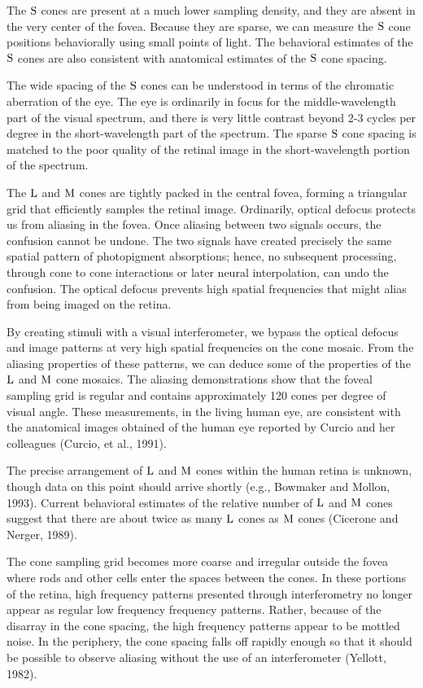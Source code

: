 The $\mbox{S}$ cones are present at a much lower
sampling density, and they are absent in the very
center of the fovea.
Because they are sparse,
we can measure the $\mbox{S}$ cone positions
behaviorally using small points of light.
The behavioral estimates of the $\mbox{S}$ cones
are also consistent with anatomical
estimates of the $\mbox{S}$ cone spacing.

The wide spacing of the $\mbox{S}$ cones can be understood
in terms of the chromatic aberration of the eye.
The eye is ordinarily in focus for the 
middle-wavelength part of the visual spectrum, and there is very
little contrast beyond 2-3 cycles per degree
in the short-wavelength part of the spectrum.
The sparse $\mbox{S}$ cone spacing is matched to the poor
quality of the retinal image in the short-wavelength
portion of the spectrum.

The $\mbox{L}$ and $\mbox{M}$ cones are tightly packed in the central fovea,
forming a triangular grid that efficiently
samples the retinal image.
Ordinarily, optical defocus protects us
from aliasing in the fovea.
Once aliasing between two
signals occurs, the confusion cannot be undone.
The two signals have created precisely
the same spatial pattern of photopigment absorptions;
hence, no subsequent processing, through cone to cone interactions
or later neural interpolation, can undo the confusion.
The optical defocus prevents
high spatial frequencies that might alias
from being imaged on the retina.

By creating stimuli with a visual interferometer,
we bypass the optical defocus and image
patterns at very high spatial frequencies on the cone mosaic.
From the aliasing properties of these
patterns, we can deduce some of the
properties of the $\mbox{L}$ and $\mbox{M}$ cone mosaics.
The aliasing demonstrations
show that the foveal sampling grid is regular and
contains approximately 120 cones per degree of visual angle.
These measurements, in the living human eye, are
consistent with the anatomical images obtained of
the human eye reported by Curcio and her colleagues
(Curcio, et al., 1991).

The precise arrangement of $\mbox{L}$ and $\mbox{M}$
cones within the human retina is unknown,
though data on this point should arrive shortly
(e.g., Bowmaker and Mollon, 1993).
Current behavioral
estimates of the relative number of $\mbox{L}$ and $\mbox{M}$
cones suggest 
that there are about twice as many $\mbox{L}$ cones
as $\mbox{M}$ cones (Cicerone and Nerger, 1989).

The cone sampling grid becomes more coarse and irregular outside
the fovea where rods and other cells enter the spaces
between the cones.
In these portions of the retina, high frequency
patterns presented through interferometry no longer
appear as regular low frequency frequency patterns.
Rather, because of the disarray in the cone spacing,
the high frequency patterns appear to be mottled noise.
In the periphery, the cone spacing falls off rapidly enough so that
it should be possible to observe aliasing without the use
of an interferometer (Yellott, 1982).

